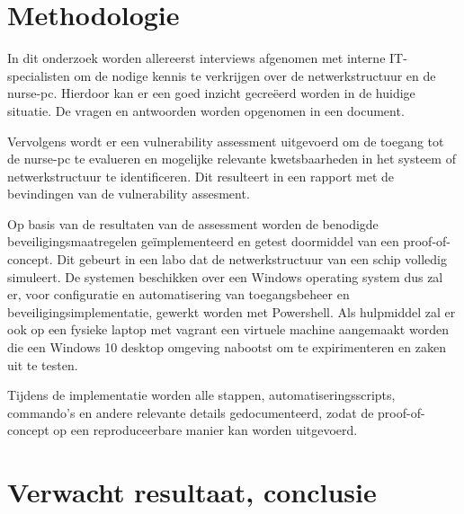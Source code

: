 \section{Methodologie}%
\label{sec:methodologie}
In dit onderzoek worden allereerst interviews afgenomen met interne IT-specialisten om de nodige kennis te verkrijgen over de netwerkstructuur en de nurse-pc. 
Hierdoor kan er een goed inzicht gecreëerd worden in de huidige situatie. De vragen en antwoorden worden opgenomen in een document.

Vervolgens wordt er een vulnerability assessment uitgevoerd om de toegang tot de nurse-pc te evalueren en mogelijke relevante kwetsbaarheden in het systeem 
of netwerkstructuur te identificeren. Dit resulteert in een rapport met de bevindingen van de vulnerability assesment.

Op basis van de resultaten van de assessment worden de benodigde beveiligingsmaatregelen geïmplementeerd en getest doormiddel van een proof-of-concept. 
Dit gebeurt in een labo dat de netwerkstructuur van een schip volledig simuleert. De systemen beschikken over een Windows operating system dus zal er, voor configuratie en automatisering van toegangsbeheer en beveiligingsimplementatie, gewerkt worden met Powershell. 
Als hulpmiddel zal er ook op een fysieke laptop met vagrant een virtuele machine aangemaakt worden die een Windows 10 desktop omgeving nabootst om te expirimenteren en zaken uit te testen.

Tijdens de implementatie worden alle stappen, automatiseringsscripts, commando's en andere relevante details gedocumenteerd, 
zodat de proof-of-concept op een reproduceerbare manier kan worden uitgevoerd.


\section{Verwacht resultaat, conclusie}%
\label{sec:verwachte_resultaten}


